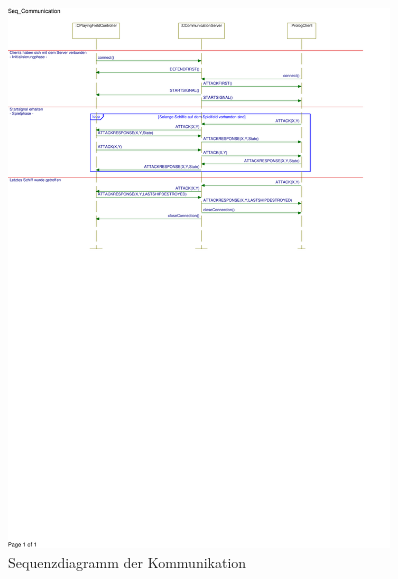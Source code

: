 \begin{figure}[H]
  \centering
  \includegraphics[trim=0mm 160mm 25mm 5mm,clip,width=0.9\textwidth]{images/SeqCommunication.pdf}
  \caption{Sequenzdiagramm der Kommunikation}
  \label{fig:Kommunikationssequenz}
\end{figure}

